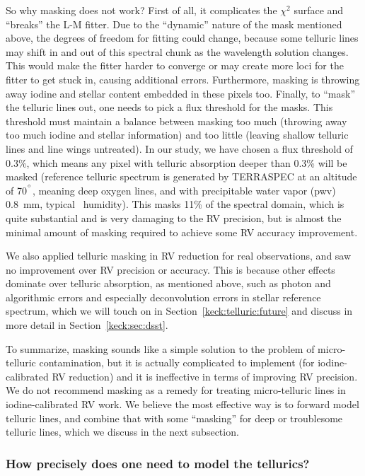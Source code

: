 So why masking does not work? First of all, it complicates the
$\chi^2$ surface and ``breaks'' the L-M fitter. Due to the ``dynamic''
nature of the mask mentioned above, the degrees of freedom for fitting
could change, because some telluric lines may shift in and out of this
spectral chunk as the wavelength solution changes. This would make the
fitter harder to converge or may create more loci for the fitter to
get stuck in, causing additional errors. Furthermore, masking is
throwing away iodine and stellar content embedded in these pixels
too. Finally, to ``mask'' the telluric lines out, one needs to pick a
flux threshold for the masks. This threshold must maintain a balance
between masking too much (throwing away too much iodine and stellar
information) and too little (leaving shallow telluric lines and line
wings untreated). In our study, we have chosen a flux threshold of
0.3\%, which means any pixel with telluric absorption deeper than
0.3\% will be masked (reference telluric spectrum is generated by
TERRASPEC at an altitude of 70$^{^{\circ}}$, meaning deep oxygen lines,
and with precipitable water vapor (pwv) 0.8~mm, typical \keck\
humidity). This masks 11\% of the spectral domain, which is quite
substantial and is very damaging to the RV precision, but is almost
the minimal amount of masking required to achieve some RV accuracy
improvement.

We also applied telluric masking in RV reduction for real
observations, and saw no improvement over RV precision or
accuracy. This is because other effects dominate over telluric
absorption, as mentioned above, such as photon and algorithmic errors
and especially deconvolution errors in stellar reference spectrum,
which we will touch on in Section~\ref{keck:telluric:future} and
discuss in more detail in Section~\ref{keck:sec:dsst}.

To summarize, masking sounds like a simple solution to the problem of
micro-telluric contamination, but it is actually complicated to
implement (for iodine-calibrated RV reduction) and it is ineffective
in terms of improving RV precision. We do not recommend masking as a
remedy for treating micro-telluric lines in iodine-calibrated RV
work. We believe the most effective way is to forward model telluric
lines, and combine that with some ``masking'' for deep or troublesome
telluric lines, which we discuss in the next subsection.

\subsubsection{How precisely does one need to model the tellurics?}


